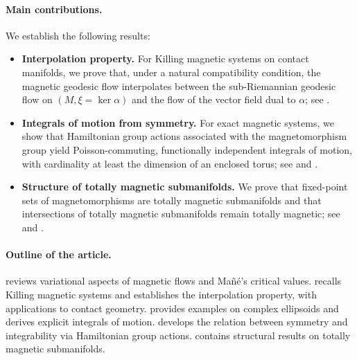 \documentclass[11pt,reqno]{amsart}
\theoremstyle{plain}
\theoremstyle{definition}
\numberwithin{equation}{section}
\begin{document}
\paragraph{\textbf{Main contributions.}}
We establish the following results:
\begin{itemize}
    \item \textbf{Interpolation property.} For Killing magnetic systems on contact manifolds, we prove that, under a natural compatibility condition, the magnetic geodesic flow interpolates between the sub-Riemannian geodesic flow on $(M,\xi=\ker\alpha)$ and the flow of the vector field dual to $\alpha$; see .
    
    \item \textbf{Integrals of motion from symmetry.} For exact magnetic systems, we show that Hamiltonian group actions associated with the magnetomorphism group yield Poisson-commuting, functionally independent integrals of motion, with cardinality at least the dimension of an enclosed %
    torus; see  and .
    
    \item \textbf{Structure of totally magnetic submanifolds.} We prove that fixed-point sets of magnetomorphisms are totally magnetic submanifolds and that intersections of totally magnetic submanifolds remain totally magnetic; see  and .
\end{itemize}\medskip

\paragraph{\textbf{Outline of the article.}}
 reviews variational aspects of magnetic flows and Mañé’s critical values.  recalls Killing magnetic systems and establishes the interpolation property, with applications to contact geometry.  provides examples on complex ellipsoids and derives explicit integrals of motion.  develops the relation between symmetry and integrability via Hamiltonian group actions.  contains structural results on totally magnetic submanifolds.
\medskip
 
\end{document}
